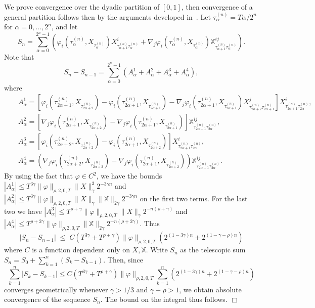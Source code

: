 \documentclass[a4paper,11pt]{article}
\newenvironment{proof}[1][Proof]{{\sc #1.} }{\hfill $\Box$}
\begin{document}
\begin{proof}
We prove convergence over the dyadic partition of $[0,1]$, then 
convergence of a general partition follows then by the arguments 
developed in~\cite{MR2091358}. Let $\tau^{(n)}_{\alpha}=T \alpha/2^n$ 
for $\alpha = 0,\dots,2^n$, and let
$$
S_n = \sum_{\alpha=0}^{2^n-1} 
\left(\varphi_i(\tau^{(n)}_\alpha,X_{\tau^{(n)}_\alpha}) 
X^i_{\tau^{(n)}_{\alpha+1}
\tau^{(n)}_\alpha}+\nabla_j 
\varphi_i(\tau^{(n)}_\alpha,X_{\tau^{(n)}_\alpha}) 
\mathbb{X}_{\tau^{(n)}_{\alpha+1}
  \tau^{(n)}_\alpha}^{ij}\right). 
$$
Note that
\begin{equation}
\label{eq:rough-split}
 S_{n}-S_{n-1} = \sum_{\alpha=0}^{2^n-1} 
(A_\alpha^1 + A_\alpha^2  +
 A_\alpha^3 + A_\alpha^4),
\end{equation}
where
\begin{eqnarray*}
&& 
A^1_\alpha  =
\left[\varphi_i(\tau^{(n)}_{2\alpha+1},X_{\tau^{(n)}_{2\alpha+2}})-
\varphi_i(\tau^{(n)}_{2\alpha+1},X_{\tau^{(n)}_{2\alpha+1}})-\nabla_j
\varphi_i(\tau^{(n)}_{2\alpha+1},X_{\tau^{(n)}_{2\alpha+1}}) 
X^j_{\tau^{(n)}_{2\alpha+2} \tau^{(n)}_{2\alpha+1}} \right] 
X^i_{\tau^{(n)}_{2\alpha+1} \tau^{(n)}_{2\alpha}}, \\
&& 
A^2_\alpha  =
\left[\nabla_j\varphi_i(\tau^{(n)}_{2\alpha+1},X_{\tau^{(n)}_{2\alpha+2}})- 
\nabla_j \varphi_i(\tau^{(n)}_{2\alpha+1},X_{\tau^{(n)}_{2\alpha+1}})\right] 
\mathbb{X}_{\tau^{(n)}_{2\alpha+1} \tau^{(n)}_{2\alpha}}^{ij},\\
&&
A^3_\alpha  = 
\left[\varphi_i(\tau^{(n)}_{2\alpha+2},X_{\tau^{(n)}_{2\alpha+2}})-
\varphi_i(\tau^{(n)}_{2\alpha+1},X_{\tau^{(n)}_{2\alpha+2}}) \right] 
X^i_{\tau^{(n)}_{2\alpha+1}\tau^{(n)}_{2\alpha}},\\
&& 
A^4_\alpha  = 
(\nabla_j\varphi_i(\tau^{(n)}_{2\alpha+2},X_{\tau^{(n)}_{2\alpha+2}})-
\nabla_j \varphi_i(\tau^{(n)}_{2\alpha+1},X_{\tau^{(n)}_{2\alpha+2}})) 
\mathbb{X}_{\tau^{(n)}_{2\alpha+1}\tau^{(n)}_{2\alpha}}^{ij}.
\end{eqnarray*}
By using the fact that $\varphi\in C^2$, we have the bounds 
$
|A^1_\alpha | \le T^{3\gamma}\|\varphi\|_{\rho,2,0,T} \|X\|^3_\gamma
2^{-3\gamma n}
$
and
$
|A^2_\alpha| \le  T^{3\gamma} \|\varphi\|_{\rho,2,0,T} \|X\|_\gamma
\|\mathbb{X}\|_{2\gamma} 2^{-3\gamma n}
$
on the first two terms.
For the last two we have
$
|A^3_\alpha| \le  T^{\rho+\gamma} \|\varphi\|_{\rho,2,0,T}
\|X\|_\gamma 2^{-n(\rho+\gamma)}
$
and 
$
| A^4_\alpha | \le  T^{\rho+2\gamma} \|\varphi\|_{\rho,2,0,T}
\|\mathbb{X}\|_{2\gamma} 2^{-n(\rho+2\gamma)}
$.
Thus
$$
|S_{n}-S_{n-1}| \; \le \; C (T^{3\gamma} +
T^{\rho+\gamma})\|\varphi\|_{\rho,2,0,T} (2^{(1-3\gamma) n}
+ 2^{(1-\gamma-\rho)n}) 
$$
where $C$ is a function dependent only on $X,\mathbb{X}$. Write
$S_n$ as the telescopic sum 
$
S_n = S_0 + \sum_{k=1}^n(S_k-S_{k-1})
$.
Then, since
$$
\sum_{k=1}^n |S_k-S_{k-1}| \le C (T^{3\gamma}+T^{\rho+\gamma}) 
\|\varphi\|_{\rho,2,0,T} \sum_{k=1}^n (2^{(1-3\gamma) n}+2^{(1-\gamma-\rho) n})
$$
converges geometrically whenever $\gamma > 1/3$ and $\gamma+\rho>1$,
we obtain absolute convergence of the sequence $S_n$. The bound on the 
integral thus follows.
\end{proof}
\end{document}
